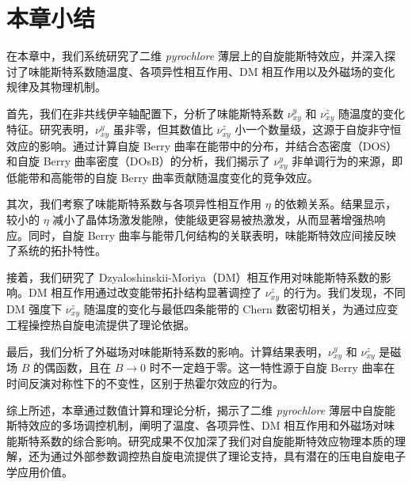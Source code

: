     \section{本章小结}

    在本章中，我们系统研究了二维 \textit{pyrochlore} 薄层上的自旋能斯特效应，并深入探讨了味能斯特系数随温度、各项异性相互作用、DM 相互作用以及外磁场的变化规律及其物理机制。

    首先，我们在非共线伊辛轴配置下，分析了味能斯特系数 $\nu^y_{xy}$ 和 $\nu^z_{xy}$ 随温度的变化特征。研究表明，$\nu^y_{xy}$ 虽非零，但其数值比 $\nu^z_{xy}$ 小一个数量级，这源于自旋非守恒效应的影响。通过计算自旋 Berry 曲率在能带中的分布，并结合态密度（DOS）和自旋 Berry 曲率密度（DOsB）的分析，我们揭示了 $\nu^y_{xy}$ 非单调行为的来源，即低能带和高能带的自旋 Berry 曲率贡献随温度变化的竞争效应。

    其次，我们考察了味能斯特系数与各项异性相互作用 $\eta$ 的依赖关系。结果显示，较小的 $\eta$ 减小了晶体场激发能隙，使能级更容易被热激发，从而显著增强热响应。同时，自旋 Berry 曲率与能带几何结构的关联表明，味能斯特效应间接反映了系统的拓扑特性。

    接着，我们研究了 Dzyaloshinskii-Moriya（DM）相互作用对味能斯特系数的影响。DM 相互作用通过改变能带拓扑结构显著调控了 $\nu^z_{xy}$ 的行为。我们发现，不同 DM 强度下 $\nu^z_{xy}$ 随温度的变化与最低四条能带的 Chern 数密切相关，为通过应变工程操控热自旋电流提供了理论依据。

    最后，我们分析了外磁场对味能斯特系数的影响。计算结果表明，$\nu^y_{xy}$ 和 $\nu^z_{xy}$ 是磁场 $B$ 的偶函数，且在 $B \to 0$ 时不一定趋于零。这一特性源于自旋 Berry 曲率在时间反演对称性下的不变性，区别于热霍尔效应的行为。

    综上所述，本章通过数值计算和理论分析，揭示了二维 \textit{pyrochlore} 薄层中自旋能斯特效应的多场调控机制，阐明了温度、各项异性、DM 相互作用和外磁场对味能斯特系数的综合影响。研究成果不仅加深了我们对自旋能斯特效应物理本质的理解，还为通过外部参数调控热自旋电流提供了理论支持，具有潜在的压电自旋电子学应用价值。